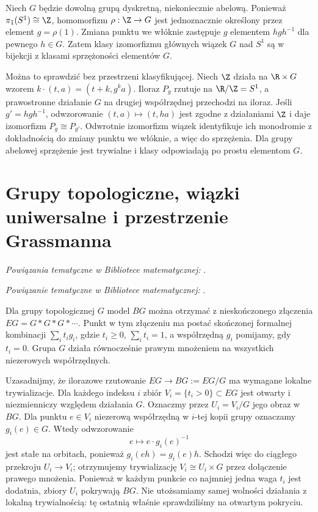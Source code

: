 \begin{przyklad}
Niech $G$ będzie dowolną grupą dyskretną, niekoniecznie
abelową. Ponieważ $\pi_1(S^1)\cong\Z$, homomorfizm
$\rho:\Z\to G$ jest jednoznacznie określony przez
element $g=\rho(1)$. Zmiana punktu we włóknie
zastępuje $g$ elementem $hgh^{-1}$ dla pewnego $h\in G$.
Zatem klasy izomorfizmu głównych wiązek $G$ nad $S^1$
są w bijekcji z klasami sprzężoności elementów $G$.

Można to sprawdzić bez przestrzeni klasyfikującej.
Niech $\Z$ działa na $\R\times G$ wzorem
$k\cdot(t,a)=(t+k,g^k a)$. Iloraz $P_g$ rzutuje
na $\R/\Z=S^1$, a prawostronne działanie $G$
na drugiej współrzędnej przechodzi na iloraz.
Jeśli $g'=hgh^{-1}$, odwzorowanie
$(t,a)\mapsto(t,ha)$ jest zgodne z działaniami
$\Z$ i daje izomorfizm $P_g\cong P_{g'}$.
Odwrotnie izomorfizm wiązek identyfikuje ich
monodromie z dokładnością do zmiany punktu we włóknie,
a więc do sprzężenia. Dla grupy abelowej sprzężenie
jest trywialne i klasy odpowiadają po prostu elementom $G$.
\end{przyklad}

\section[Grupy topologiczne i wiązki uniwersalne]{Grupy topologiczne, wiązki uniwersalne i przestrzenie Grassmanna}

\noindent\emph{Powiązania tematyczne w Bibliotece matematycznej:} .


\noindent\emph{Powiązanie tematyczne w Bibliotece matematycznej:} .

Dla grupy topologicznej $G$ model $BG$ można otrzymać
z nieskończonego złączenia $EG=G*G*G*\cdots$.
Punkt w tym złączeniu ma postać skończonej formalnej
kombinacji $\sum_i t_i g_i$, gdzie $t_i\ge0$,
$\sum_i t_i=1$, a współrzędną $g_i$ pomijamy,
gdy $t_i=0$. Grupa $G$ działa równocześnie prawym
mnożeniem na wszystkich niezerowych współrzędnych.

Uzasadnijmy, że ilorazowe rzutowanie
$EG\to BG:=EG/G$ ma wymagane lokalne trywializacje.
Dla każdego indeksu $i$ zbiór $V_i=\{t_i>0\}\subset EG$
jest otwarty i niezmienniczy względem działania $G$.
Oznaczmy przez $U_i=V_i/G$ jego obraz w $BG$.
Dla punktu $e\in V_i$ niezerową współrzędną
w $i$-tej kopii grupy oznaczamy $g_i(e)\in G$.
Wtedy odwzorowanie
\[
 e\longmapsto e\cdot g_i(e)^{-1}
\]
jest stałe na orbitach, ponieważ
$g_i(eh)=g_i(e)h$. Schodzi więc do ciągłego
przekroju $U_i\to V_i$; otrzymujemy trywializację
$V_i\cong U_i\times G$ przez dołączenie prawego
mnożenia. Ponieważ w każdym punkcie co najmniej
jedna waga $t_i$ jest dodatnia, zbiory $U_i$
pokrywają $BG$. Nie utożsamiamy samej wolności
działania z lokalną trywialnością: tę ostatnią
właśnie sprawdziliśmy na otwartym pokryciu.

